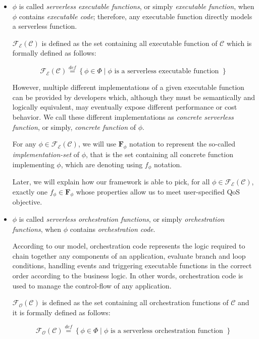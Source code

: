 \documentclass[12pt,a4paper]{report}
\newcommand{\mathDef}{\overset{\textit{def}}{=}}
\theoremstyle{definition}
\begin{document}
\begin{itemize}
	
	\item $\phi$ is called \textit{serverless executable functions}, or simply \textit{executable function}, when $\phi$ contains \textit{executable code}; therefore, any executable function directly models a serverless function.
	
	$\mathscr{F_E}(\mathcal{C})$ is defined as the set containing all executable function of $\mathcal{C}$ which is formally defined as follows:
	
	\begin{equation}
		\mathscr{F_E(\mathcal{C})} \mathDef \left\lbrace \phi \in \Phi \mid \phi \text{ is a serverless executable function }\right\rbrace 
	\end{equation}
	
	However, multiple different implementations of a given executable function can be provided by developers which, although they must be semantically and logically equivalent, may eventually expose different performance or cost behavior. We call these different implementations as \textit{concrete serverless function}, or simply, \textit{concrete function} of $\phi$.
	
	For any $\phi \in \mathscr{F_E}(\mathcal{C})$, we will use $\textbf{F}_{\phi}$ notation to represent the so-called \textit{implementation-set} of $\phi$, that is the set containing all concrete function implementing $\phi$, which are denoting using $f_{\phi}$ notation. 

	Later, we will explain how our framework is able to pick, for all $\phi \in \mathscr{F_E}(\mathcal{C})$, exactly one $f_{\phi} \in \textbf{F}_{\phi}$ whose properties allow us to meet user-specified QoS objective.
	
	\item $\phi$ is called \textit{serverless orchestration functions}, or simply \textit{orchestration functions}, when $\phi$ contains \textit{orchestration code}. 
	
	According to our model, orchestration code represents the logic required to chain together any components of an application, evaluate branch and loop conditions, handling events and triggering executable functions in the correct order according to the business logic. In other words, orchestration code is used to manage the control-flow of any application.
	
	$\mathscr{F_O}(\mathcal{C})$ is defined as the set containing all orchestration functions of $\mathcal{C}$ and it is formally defined as follows:
	
	\begin{equation}
		\mathscr{F_O}(\mathcal{C}) \mathDef \left\lbrace \phi \in \Phi \mid \phi \text{ is a serverless orchestration function }\right\rbrace 
	\end{equation}
	
\end{itemize}
\end{document}
